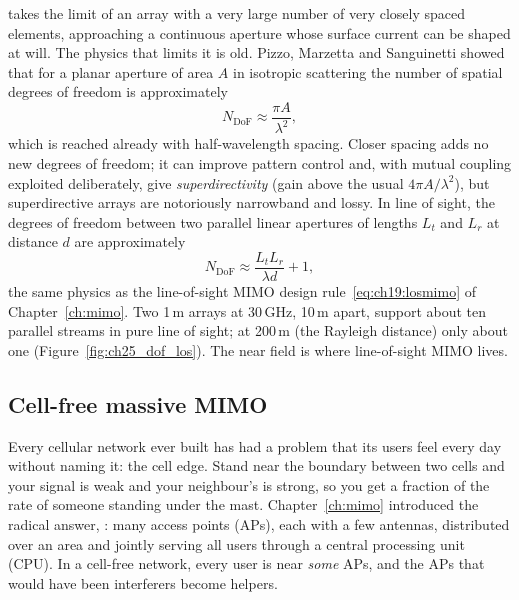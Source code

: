  takes the limit of an array with a very large number of very closely spaced
elements, approaching a continuous aperture whose surface current can be shaped at will. The physics
that limits it is old. Pizzo, Marzetta and Sanguinetti showed that for a planar aperture of area $A$ in
isotropic scattering the number of spatial degrees of freedom is approximately
\begin{equation}
N_{\text{DoF}}\approx\frac{\pi A}{\lambda^2},
\label{eq:ch25:dofarea}
\end{equation}
which is reached already with half-wavelength spacing. Closer spacing adds no new degrees of freedom;
it can improve pattern control and, with mutual coupling exploited deliberately, give
\emph{superdirectivity} (gain above the usual $4\pi A/\lambda^2$), but superdirective arrays are
notoriously narrowband and lossy. In line of sight, the degrees of freedom between two parallel linear
apertures of lengths $L_t$ and $L_r$ at distance $d$ are approximately
\begin{equation}
N_{\text{DoF}}\approx\frac{L_tL_r}{\lambda d}+1,
\label{eq:ch25:doflos}
\end{equation}
the same physics as the line-of-sight MIMO design rule~\eqref{eq:ch19:losmimo} of
Chapter~\ref{ch:mimo}. Two 1\,m arrays at 30\,GHz, 10\,m apart, support about ten parallel streams in
pure line of sight; at 200\,m (the Rayleigh distance) only about one (Figure~\ref{fig:ch25_dof_los}).
The near field is where line-of-sight MIMO lives.

\subsection{Cell-free massive MIMO}

Every cellular network ever built has had a problem that its users feel every day without naming
it: the cell edge. Stand near the boundary between two cells and your signal is weak and your
neighbour's is strong, so you get a fraction of the rate of someone standing under the mast.
Chapter~\ref{ch:mimo} introduced the radical answer, : many access points
(APs), each with a few antennas, distributed over an area and jointly serving all users through a
central processing unit (CPU). In a cell-free network, every user is near \emph{some} APs, and the APs
that would have been interferers become helpers.


